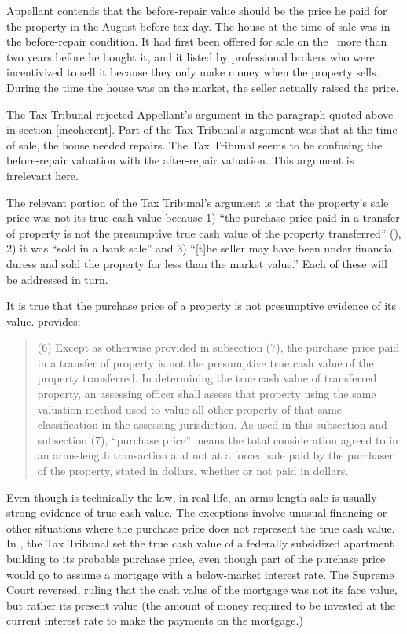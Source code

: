 \documentclass[12pt,\documentclassflag]{michiganCourtOfAppealsBrief}
\begin{document}
{Appellant contends that the before-repair value should be the price he paid for the property in the August before tax day. The house at the time of sale was in the before-repair condition. It had first been offered for sale on the \MLS\ more than two years before he bought it, and it listed by professional brokers who were incentivized to sell it because they only make money when the property sells. During the time the house was on the market, the seller actually raised the price.

The Tax Tribunal rejected Appellant's argument in the paragraph quoted above in section \ref{incoherent}. Part of the Tax Tribunal's argument was that at the time of sale, the house needed repairs. The Tax Tribunal seems to be confusing the before-repair valuation with the after-repair valuation. This argument is irrelevant here.

The relevant portion of the Tax Tribunal's argument is that the property's sale price was not its true cash value because 1) ``the purchase price paid in a transfer of property is not the presumptive true cash value of the property transferred'' (), 2)  it was ``sold in a bank sale'' and 3) ``[t]he seller may have been under financial duress and sold the property for less than the market value.'' Each of these will be addressed in turn.

It is true that the purchase price of a property is not presumptive evidence of its value.  provides: 

\begin{quote} (6) Except as otherwise provided in subsection (7), the purchase price paid in a transfer of property is not the presumptive true cash value of the property transferred. In determining the true cash value of transferred property, an assessing officer shall assess that property using the same valuation method used to value all other property of that same classification in the assessing jurisdiction. As used in this subsection and subsection (7), ``purchase price'' means the total consideration agreed to in an arms-length transaction and not at a forced sale paid by the purchaser of the property, stated in dollars, whether or not paid in dollars.
\end{quote}

Even though  is technically the law, in real life, an arms-length sale is usually strong evidence of true cash value. The exceptions involve unusual financing or other situations where the purchase price does not represent the true cash value. In \cite[s]{Antisdale}, the Tax Tribunal set the true cash value of a federally subsidized apartment building to its probable purchase price, even though part of the purchase price would go to assume a mortgage with a below-market interest rate. The Supreme Court reversed, ruling that the cash value of the mortgage was not its face value, but rather its present value (the amount of money required to be invested at the current interest rate to make the payments on the mortgage.) 

}
\end{document}
